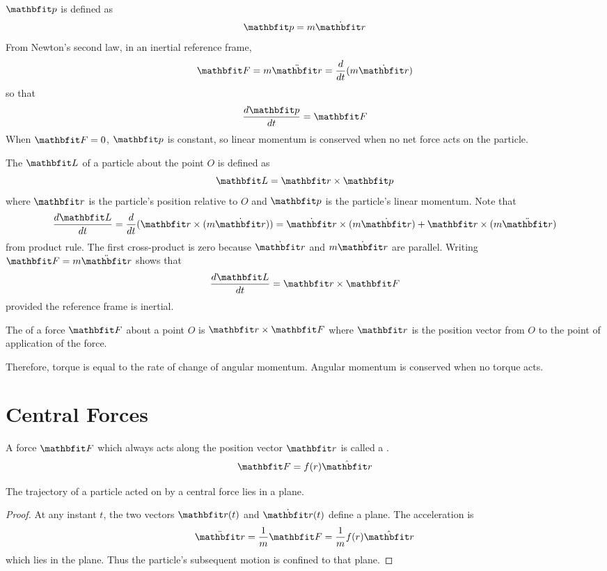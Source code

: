  $\vect{p}$ is defined as
$$\vect{p}=m\dot{\vect{r}}$$
From Newton's second law, in an inertial reference frame,
$$\vect{F}=m\ddot{\vect{r}}=\dbd{t}(m\dot{\vect{r}})$$
so that
$$\der{\vect{p}}{t}=\vect{F}$$
When $\vect{F}=0$, $\vect{p}$ is constant, so linear momentum is conserved
when no net force acts on the particle.

The  $\vect{L}$ of a particle about the point $O$
is defined as 
$$\vect{L}=\vect{r}\times\vect{p}$$
where $\vect{r}$ is the particle's position relative to $O$ and $\vect{p}$
is the particle's linear momentum.  Note that
$$\der{\vect{L}}{t}=\dbd{t}(\vect{r}\times(m\dot{\vect{r}}))
=\dot{\vect{r}}\times(m\dot{\vect{r}})+\vect{r}\times(m\ddot{\vect{r}})$$
from product rule.  The first cross-product is zero because $\dot{\vect{r}}$
and $m\dot{\vect{r}}$ are parallel.  Writing $\vect{F}=m\ddot{\vect{r}}$
shows that
$$\der{\vect{L}}{t}=\vect{r}\times \vect{F}$$
provided the reference frame is inertial.

The  of a force $\vect{F}$ about a point $O$ is
$\vect{r}\times\vect{F}$ where $\vect{r}$ is the position vector from $O$ to
the point of application of the force.  

Therefore, torque is equal to the rate of change of angular momentum.  Angular
momentum is conserved when no torque acts.

\section{Central Forces}

A force $\vect{F}$ which always acts along the position vector $\vect{r}$ is
called a .
$$\vect{F}=f(r)\rvect$$

\begin{theorem}
The trajectory of a particle acted on by a central force lies in a plane.
\end{theorem}

\begin{proof}
At any instant $t$, the two vectors $\vect{r}(t)$ and $\dot{\vect{r}}(t)$
define a plane.  The acceleration is
$$\ddot{\vect{r}}=\frac{1}{m}\vect{F}=\frac{1}{m}f(r)\rvect$$
which lies in the plane.  Thus the particle's subsequent motion is confined
to that plane.
\end{proof}

